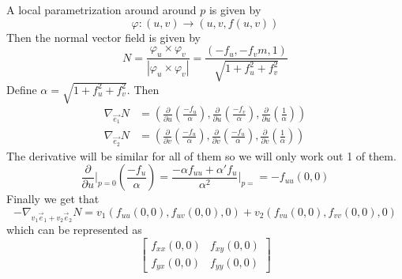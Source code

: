 \documentclass[12pt, answers]{exam}
\begin{document}
\begin{questions}
        \begin{solution}
            A local parametrization around around $p$ is given by
            \[ \varphi:(u, v) \to (u, v, f(u, v)) \]
            Then the normal vector field is given by
            \[ N = \frac{\varphi_u \times \varphi_v}{|\varphi_u \times \varphi_v|} = \frac{(-f_u, -f_vm, 1)}{\sqrt{1 + f_u^2 + f_v^2}} \]
            Define $\alpha = \sqrt{1 + f_u^2 + f_v^2}$. Then
            \begin{align*}
                \nabla_{\vec{e_1}}N &= \left( \frac{\partial}{\partial u} \left(\frac{-f_u}{\alpha}\right),
                \frac{\partial}{\partial u} \left(\frac{-f_v}{\alpha}\right), \frac{\partial}{\partial u} \left(\frac{1}{\alpha}\right) \right)\\
                \nabla_{\vec{e_2}}N &= \left( \frac{\partial}{\partial v} \left(\frac{-f_u}{\alpha}\right),
                \frac{\partial}{\partial v} \left(\frac{-f_u}{\alpha}\right), \frac{\partial}{\partial v} \left(\frac{1}{\alpha}\right) \right)
            \end{align*}
            The derivative will be similar for all of them so we will only work out 1 of them.
            \[ \frac{\partial}{\partial u}\bigg\rvert_{p = 0} \left( \frac{-f_u}{\alpha} \right) =
            \frac{-\alpha f_{uu} + \alpha'f_u}{\alpha^2}\bigg\rvert_{p = } = -f_{uu}(0, 0)\]
            Finally we get that
            \[-\nabla_{v_1\vec{e}_1 + v_2\vec{e}_2}N = v_1\left( f_{uu}(0, 0), f_{uv}(0, 0), 0 \right) +
            v_2\left( f_{vu}(0, 0), f_{vv}(0, 0), 0 \right)\]
            which can be represented as
            \[
                \begin{bmatrix}
                    f_{xx}(0, 0) & f_{xy}(0, 0) \\
                    f_{yx}(0, 0) & f_{yy}(0, 0)
                \end{bmatrix}
            \]
        \end{solution}
    \end{questions}
\end{document}
